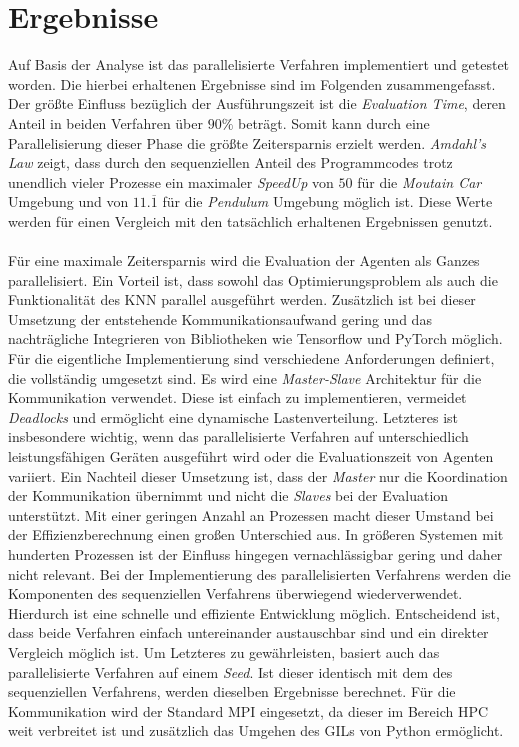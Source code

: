 \section{Ergebnisse}
\label{sec:results_optimziation}
Auf Basis der Analyse ist das parallelisierte Verfahren implementiert und getestet worden. Die hierbei erhaltenen Ergebnisse sind im Folgenden zusammengefasst. Der größte Einfluss bezüglich der Ausführungszeit ist die \emph{Evaluation Time}, deren Anteil in beiden Verfahren über $90\%$ beträgt. Somit kann durch eine Parallelisierung dieser Phase die größte Zeitersparnis erzielt werden. \emph{Amdahl's Law} zeigt, dass durch den sequenziellen Anteil des Programmcodes trotz unendlich vieler Prozesse ein maximaler \emph{SpeedUp} von $50$ für die \emph{Moutain Car} Umgebung und von $11.\overline{1}$ für die \emph{Pendulum} Umgebung möglich ist. Diese Werte werden für einen Vergleich mit den tatsächlich erhaltenen Ergebnissen genutzt.
\\\\ %
Für eine maximale Zeitersparnis wird die Evaluation der Agenten als Ganzes parallelisiert. Ein Vorteil ist, dass sowohl das Optimierungsproblem als auch die Funktionalität des \ac{KNN} parallel ausgeführt werden. Zusätzlich ist bei dieser Umsetzung der entstehende Kommunikationsaufwand gering und das nachträgliche Integrieren von Bibliotheken wie Tensorflow und PyTorch möglich. Für die eigentliche Implementierung sind verschiedene Anforderungen definiert, die vollständig umgesetzt sind. Es wird eine \emph{Master-Slave} Architektur für die Kommunikation verwendet. Diese ist einfach zu implementieren, vermeidet \emph{Deadlocks} und ermöglicht eine dynamische Lastenverteilung. Letzteres ist insbesondere wichtig, wenn das parallelisierte Verfahren auf unterschiedlich leistungsfähigen Geräten ausgeführt wird oder die Evaluationszeit von Agenten variiert. Ein Nachteil dieser Umsetzung ist, dass der \emph{Master} nur die Koordination der Kommunikation übernimmt und nicht die \emph{Slaves} bei der Evaluation unterstützt. Mit einer geringen Anzahl an Prozessen macht dieser Umstand bei der Effizienzberechnung einen großen Unterschied aus. In größeren Systemen mit hunderten Prozessen ist der Einfluss hingegen vernachlässigbar gering und daher nicht relevant. Bei der Implementierung des parallelisierten Verfahrens werden die Komponenten des sequenziellen Verfahrens überwiegend wiederverwendet. Hierdurch ist eine schnelle und effiziente Entwicklung möglich. Entscheidend ist, dass beide Verfahren einfach untereinander austauschbar sind und ein direkter Vergleich möglich ist. Um Letzteres zu gewährleisten, basiert auch das parallelisierte Verfahren auf einem \emph{Seed}. Ist dieser identisch mit dem des sequenziellen Verfahrens, werden dieselben Ergebnisse berechnet. Für die Kommunikation wird der Standard \ac{MPI} eingesetzt, da dieser im Bereich \ac{HPC} weit verbreitet ist und zusätzlich das Umgehen des \acp{GIL} von Python ermöglicht.
